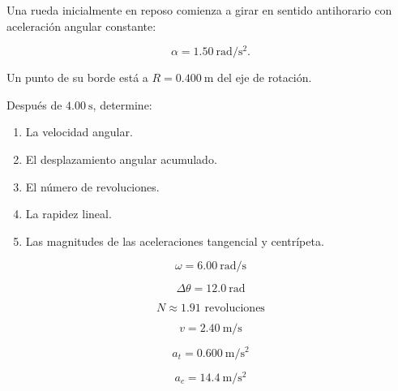 \begin{ejercicio}
Una rueda inicialmente en reposo comienza a girar en sentido
antihorario con aceleración angular constante:

\[
\alpha=\SI{1.50}{\radian\per\second\squared}.
\]

Un punto de su borde está a \(R=\SI{0.400}{\meter}\)
del eje de rotación.

Después de \(\SI{4.00}{\second}\), determine:

\begin{enumerate}[label=\alph*)]
    \item La velocidad angular.
    \item El desplazamiento angular acumulado.
    \item El número de revoluciones.
    \item La rapidez lineal.
    \item Las magnitudes de las aceleraciones tangencial y centrípeta.
\end{enumerate}
\end{ejercicio}

\begin{respuesta}
\[
\boxed{\omega=\SI{6.00}{\radian\per\second}}
\]

\[
\boxed{\Delta\theta=\SI{12.0}{\radian}}
\]

\[
\boxed{N\approx1.91\text{ revoluciones}}
\]

\[
\boxed{v=\SI{2.40}{\meter\per\second}}
\]

\[
\boxed{a_t=\SI{0.600}{\meter\per\second\squared}}
\]

\[
\boxed{a_c=\SI{14.4}{\meter\per\second\squared}}
\]
\end{respuesta}

